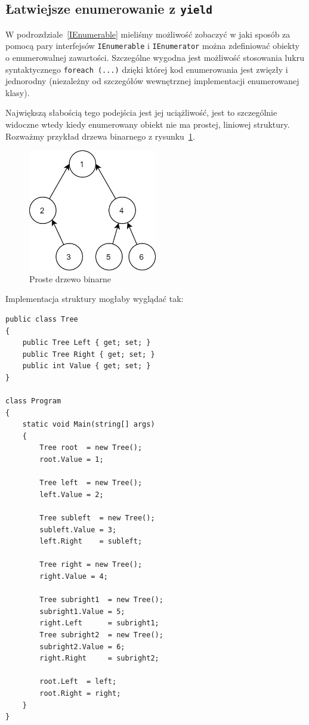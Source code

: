 \subsection{Łatwiejsze enumerowanie z {\tt yield}}

W podrozdziale~\ref{IEnumerable} mieliśmy możliwość zobaczyć w jaki sposób za pomocą pary interfejsów 
{\tt IEnumerable} i {\tt IEnumerator} można zdefiniować obiekty o enumerowalnej zawartości. Szczególne wygodna
jest możliwość stosowania lukru syntaktycznego {\tt foreach (...)} dzięki której kod enumerowania jest zwięzły i 
jednorodny (niezależny od szczegółów wewnętrznej implementacji enumerowanej klasy).

Największą słabością tego podejścia jest jej uciążliwość, jest to szczególnie widoczne wtedy kiedy enumerowany obiekt
nie ma prostej, liniowej struktury. Rozważmy przykład drzewa binarnego z rysunku~\ref{fig:pbintree}.

\begin{figure}
\begin{center}
\includegraphics[width=0.50\textwidth]{./pic/tree}
\caption{Proste drzewo binarne}
\label{fig:pbintree}
\end{center}
\end{figure}

Implementacja struktury mogłaby wyglądać tak:

\begin{scriptsize}
\begin{verbatim}
public class Tree
{
    public Tree Left { get; set; }
    public Tree Right { get; set; }
    public int Value { get; set; }
}

class Program
{
    static void Main(string[] args)
    {
        Tree root  = new Tree();
        root.Value = 1;

        Tree left  = new Tree();
        left.Value = 2;

        Tree subleft  = new Tree();
        subleft.Value = 3;
        left.Right    = subleft;

        Tree right = new Tree();
        right.Value = 4;

        Tree subright1  = new Tree();
        subright1.Value = 5;
        right.Left      = subright1;
        Tree subright2  = new Tree();
        subright2.Value = 6;
        right.Right     = subright2;

        root.Left  = left;
        root.Right = right;
    }
}
\end{verbatim}
\end{scriptsize}

